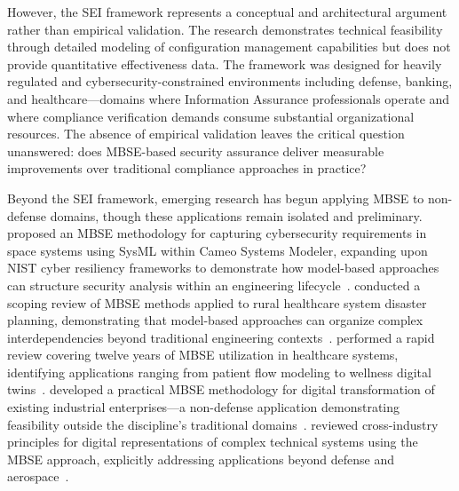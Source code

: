 However, the SEI framework represents a conceptual and architectural argument rather than empirical validation. The research demonstrates technical feasibility through detailed modeling of configuration management capabilities but does not provide quantitative effectiveness data. The framework was designed for heavily regulated and cybersecurity-constrained environments including defense, banking, and healthcare---domains where Information Assurance professionals operate and where compliance verification demands consume substantial organizational resources. The absence of empirical validation leaves the critical question unanswered: does MBSE-based security assurance deliver measurable improvements over traditional compliance approaches in practice?

Beyond the SEI framework, emerging research has begun applying MBSE to non-defense domains, though these applications remain isolated and preliminary. \citeauthor{Gordon_Reilly_2023} proposed an MBSE methodology for capturing cybersecurity requirements in space systems using SysML within Cameo Systems Modeler, expanding upon NIST cyber resiliency frameworks to demonstrate how model-based approaches can structure security analysis within an engineering lifecycle~\parencite{Gordon_Reilly_2023}. \citeauthor{Berg_2023} conducted a scoping review of MBSE methods applied to rural healthcare system disaster planning, demonstrating that model-based approaches can organize complex interdependencies beyond traditional engineering contexts~\parencite{Berg_2023}. \citeauthor{Xames_2024} performed a rapid review covering twelve years of MBSE utilization in healthcare systems, identifying applications ranging from patient flow modeling to wellness digital twins~\parencite{Xames_2024}. \citeauthor{Badenko_2024} developed a practical MBSE methodology for digital transformation of existing industrial enterprises---a non-defense application demonstrating feasibility outside the discipline's traditional domains~\parencite{Badenko_2024}. \citeauthor{Bolshakov_2023} reviewed cross-industry principles for digital representations of complex technical systems using the MBSE approach, explicitly addressing applications beyond defense and aerospace~\parencite{Bolshakov_2023}.

